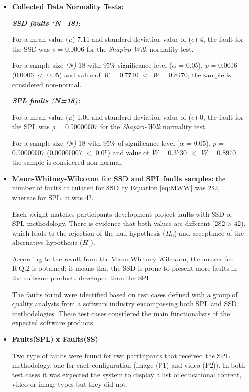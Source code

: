 \begin{itemize}
\setlength\itemsep{0.8em}

\item \textbf{Collected Data Normality Tests:} 

\textbf{\textit{SSD faults (\textit{N}=18):}}

For a mean value ($\mu$) 7.11 and standard deviation value of ($\sigma$) 4, the fault for the SSD was \textit{p} = 0.0006 for the \textit{Shapiro-Wilk} normality test.

For a sample size \textit{(N)} 18 with 95\% significance level ($\alpha$ = 0.05), \textit{p} = 0.0006 (0.0006 $<$ 0.05) and value of \textit{W} = 0.7740 $<$ \textit{W} = 0.8970, the sample is considered non-normal.

\textbf{\textit{SPL faults (\textit{N}=18):}}

For a mean value ($\mu$) 1.00 and standard deviation value of ($\sigma$) 0, the fault for the SPL was \textit{p} = 0.00000007 for the \textit{Shapiro-Wilk} normality test.

For a sample size \textit{(N)} 18 with 95\% of significance level ($\alpha$ = 0.05), \textit{p} = 0.00000007 (0.00000007 $<$ 0.05) and value of \textit{W} = 0.3730 $<$ \textit{W} = 0.8970, the sample is considered non-normal.

\item \textbf{Mann-Whitney-Wilcoxon for SSD and SPL faults samples:} the number of faults calculated for SSD by Equation \ref{eq:MWW} was 282, whereas for SPL, it was 42.

Each weight matches participants development project faults with SSD or SPL methodology. There is evidence that both values are different ($282>42$), which leads to the rejection of the null hypothesis ($H_0$) and acceptance of the alternative hypothesis ($H_{1}$).

According to the result from the Mann-Whitney-Wilcoxon, the answer for R.Q.2 is obtained: it means that the SSD is prone to present more faults in the software products developed than the SPL. 

The faults found were identified based on test cases defined with a group of quality analysts from a software industry encompassing both SPL and SSD methodologies. These test cases considered the main functionalists of the expected software products. 

\item \textbf{Faults(SPL) x Faults(SS)}

Two type of faults were found for two participants that received the SPL methodology, one for each configuration (image (P1) and video (P2)). In both test cases it was expected the system to display a list of educational content, video or image types but they did not. 


\end{itemize}
